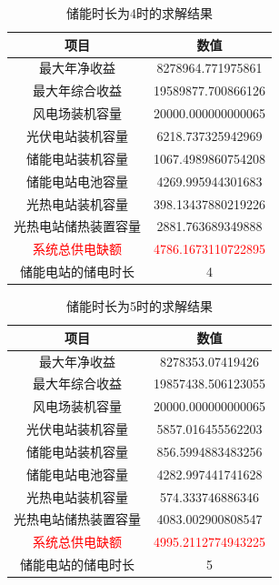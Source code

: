 \documentclass{article}
\begin{document}
\begin{table}[H]
    \centering
    \caption{储能时长为4时的求解结果}
    \label{tab:energy_system_data_4}
    \begin{tabular}{c|c}
        \toprule
        \textbf{项目} & \textbf{数值} \\
        \midrule
        最大年净收益 & 8278964.771975861 \\
        最大年综合收益 & 19589877.700866126 \\
        风电场装机容量 & 20000.000000000065 \\
        光伏电站装机容量 & 6218.737325942969 \\
        储能电站装机容量 & 1067.4989860754208 \\
        储能电站电池容量 & 4269.995944301683 \\
        光热电站装机容量 & 398.13437880219226 \\
        光热电站储热装置容量 & 2881.763689349888 \\
        \textcolor{red}{系统总供电缺额} & \textcolor{red}{4786.1673110722895} \\
        储能电站的储电时长 & 4 \\
        \bottomrule
    \end{tabular}
\end{table}

\begin{table}[H]
    \centering
    \caption{储能时长为5时的求解结果}
    \label{tab:energy_system_data_5}
    \begin{tabular}{c|c}
        \toprule
        \textbf{项目} & \textbf{数值} \\
        \midrule
        最大年净收益 & 8278353.07419426 \\
        最大年综合收益 & 19857438.506123055 \\
        风电场装机容量 & 20000.000000000065 \\
        光伏电站装机容量 & 5857.016455562203 \\
        储能电站装机容量 & 856.5994883483256 \\
        储能电站电池容量 & 4282.997441741628 \\
        光热电站装机容量 & 574.333746886346 \\
        光热电站储热装置容量 & 4083.002900808547 \\
        \textcolor{red}{系统总供电缺额} & \textcolor{red}{4995.2112774943225} \\
        储能电站的储电时长 & 5 \\
        \bottomrule
    \end{tabular}
\end{table}
\end{document}
